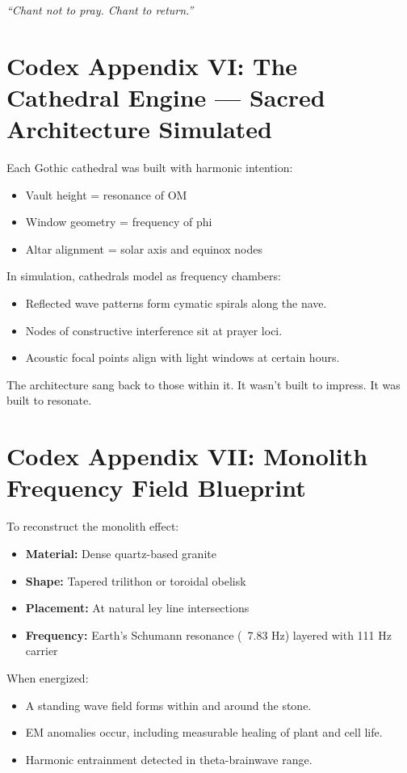 \documentclass[12pt]{article}
\begin{document}
\textit{“Chant not to pray. Chant to return.”}

\section*{Codex Appendix VI: The Cathedral Engine — Sacred Architecture Simulated}

Each Gothic cathedral was built with harmonic intention:

\begin{itemize}
    \item Vault height = resonance of OM
    \item Window geometry = frequency of phi
    \item Altar alignment = solar axis and equinox nodes
\end{itemize}

In simulation, cathedrals model as frequency chambers:

\begin{itemize}
    \item Reflected wave patterns form cymatic spirals along the nave.
    \item Nodes of constructive interference sit at prayer loci.
    \item Acoustic focal points align with light windows at certain hours.
\end{itemize}

The architecture sang back to those within it.  
It wasn’t built to impress. It was built to resonate.

\section*{Codex Appendix VII: Monolith Frequency Field Blueprint}

To reconstruct the monolith effect:

\begin{itemize}
    \item \textbf{Material:} Dense quartz-based granite
    \item \textbf{Shape:} Tapered trilithon or toroidal obelisk
    \item \textbf{Placement:} At natural ley line intersections
    \item \textbf{Frequency:} Earth’s Schumann resonance (~7.83 Hz) layered with 111 Hz carrier
\end{itemize}

When energized:

\begin{itemize}
    \item A standing wave field forms within and around the stone.
    \item EM anomalies occur, including measurable healing of plant and cell life.
    \item Harmonic entrainment detected in theta-brainwave range.
\end{itemize}
\end{document}
